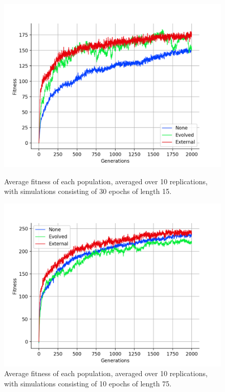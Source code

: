 \documentclass[12pt,a4paper,twoside,openright]{report}
\begin{document}
\begin{figure}[t]
   \centering
   \begin{minipage}{0.49\textwidth}
          \centering
          \captionsetup{width=.9\linewidth}
          \includegraphics[width=1.\linewidth]{results/average-short-epo.png}
          \caption{Average fitness of each population, averaged over 10 replications, with simulations consisting of 30 epochs of length 15.}
          \label{fig:average-short-epo}
   \end{minipage}
   \begin{minipage}{0.49\textwidth}
          \centering
          \captionsetup{width=.9\linewidth}
          \includegraphics[width=1.\linewidth]{results/average-long-epo.png}
          \caption{Average fitness of each population, averaged over 10 replications, with simulations consisting of 10 epochs of length 75.}
          \label{fig:average-long-epo}
   \end{minipage}
\end{figure}
\end{document}
